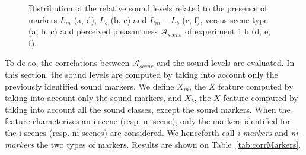 \documentclass[12pt]{elsarticle}
\newcommand{\cf}{cf.}
\begin{document}
\begin{figure}[t]
        \caption{Distribution of the relative sound levels related to the presence of markers $L_m$ (a, d), $L_b$ (b, e) and $L_m-L_b$ (c, f), versus scene type (a, b, c) and perceived pleasantness $\mathcal{A}_{scene}$ of experiment 1.b (d, e, f).}\label{fig:soundlevelMarker}
\end{figure}


To do so, the correlations between $\mathcal{A}_{scene}$ and the sound levels are evaluated. In this section, the sound levels are computed by taking into account only the previously identified sound markers. We define $X_m$, the $X$ feature computed by taking into account only the sound markers, and $X_b$, the $X$ feature computed by taking into account all the sound classes, except the sound markers. When the feature characterizes an i-scene (resp. ni-scene), only the markers identified for the i-scenes (resp. ni-scenes) are considered. We henceforth call \emph{i-markers} and \emph{ni-markers} the two types of markers. Results are shown on Table~\ref{tab:corrMarkers}.

\end{document}
